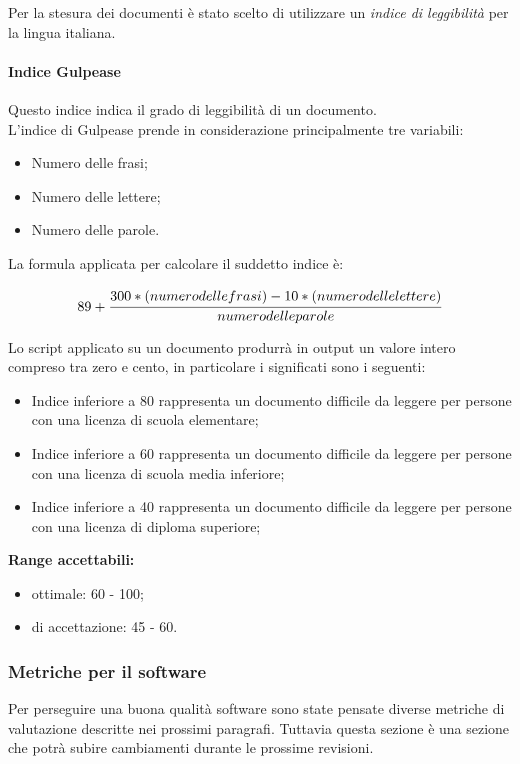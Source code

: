 \documentclass{scalatekids-article}
\begin{document}
\label{sec:metricheDocumenti}
Per la stesura dei documenti è stato scelto di utilizzare un \textit{indice di leggibilità} per la lingua italiana.
\paragraph{Indice Gulpease}
\label{par:metricheGulpease}
Questo indice indica il grado di leggibilità di un documento.\\L'indice di Gulpease prende in considerazione principalmente tre variabili:
\begin{itemize}
\item Numero delle frasi;
\item Numero delle lettere;
\item Numero delle parole.
\end{itemize}
La formula applicata per calcolare il suddetto indice è:
\begin{center}
\begin{equation}
  89 + \cfrac{300 * (numero delle frasi) - 10 * (numero delle lettere)}{numero delle parole}
\end{equation}
\end{center}
Lo script applicato su un documento produrrà in output un valore intero compreso tra zero e cento, in particolare i significati sono i seguenti:
\begin{itemize}
  \item Indice inferiore a 80 rappresenta un documento difficile da leggere per persone con una licenza di scuola elementare;
  \item Indice inferiore a 60 rappresenta un documento difficile da leggere per persone con una licenza di scuola media inferiore;
  \item Indice inferiore a 40 rappresenta un documento difficile da leggere per persone con una licenza di diploma superiore;
\end{itemize}
\textbf{Range accettabili:}
\begin{itemize}
  \item {} ottimale: 60 - 100;
  \item {} di accettazione: 45 - 60.
\end{itemize}

\subsubsection{Metriche per il software}
\label{sec:metricheSW}

Per perseguire una buona qualità software sono state pensate diverse metriche di valutazione descritte nei prossimi paragrafi. Tuttavia questa sezione è una sezione che potrà subire cambiamenti durante le prossime revisioni.
\end{document}
